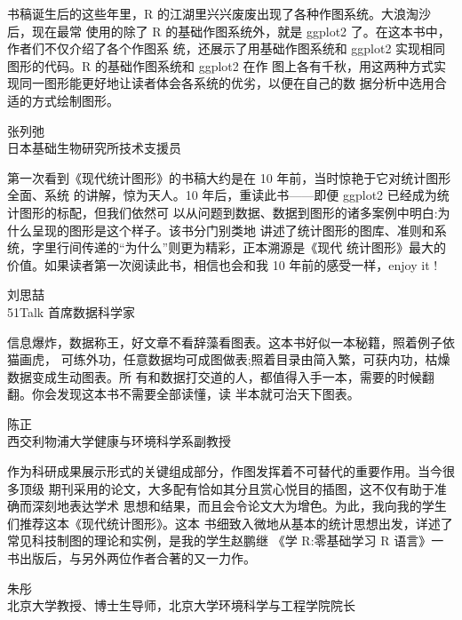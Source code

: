 \documentclass[
  b5paper,
  UTF8,twoside]{book}
\begin{document}
书稿诞生后的这些年里，R 的江湖里兴兴废废出现了各种作图系统。大浪淘沙后，现在最常 使用的除了 R 的基础作图系统外，就是 ggplot2 了。在这本书中，作者们不仅介绍了各个作图系 统，还展示了用基础作图系统和 ggplot2 实现相同图形的代码。R 的基础作图系统和 ggplot2 在作 图上各有千秋，用这两种方式实现同一图形能更好地让读者体会各系统的优劣，以便在自己的数 据分析中选用合适的方式绘制图形。

\begin{flushright}
张列弛\\
日本基础生物研究所技术支援员
\end{flushright}

第一次看到《现代统计图形》的书稿大约是在 10 年前，当时惊艳于它对统计图形全面、系统 的讲解，惊为天人。10 年后，重读此书------即便 ggplot2 已经成为统计图形的标配，但我们依然可 以从问题到数据、数据到图形的诸多案例中明白:为什么呈现的图形是这个样子。该书分门别类地 讲述了统计图形的图库、准则和系统，字里行间传递的``为什么''则更为精彩，正本溯源是《现代 统计图形》最大的价值。如果读者第一次阅读此书，相信也会和我 10 年前的感受一样，enjoy it !

\begin{flushright}
刘思喆\\
51Talk 首席数据科学家
\end{flushright}

信息爆炸，数据称王，好文章不看辞藻看图表。这本书好似一本秘籍，照着例子依猫画虎， 可练外功，任意数据均可成图做表;照着目录由简入繁，可获内功，枯燥数据变成生动图表。所 有和数据打交道的人，都值得入手一本，需要的时候翻翻。你会发现这本书不需要全部读懂，读 半本就可治天下图表。

\begin{flushright}
陈正\\
西交利物浦大学健康与环境科学系副教授
\end{flushright}

作为科研成果展示形式的关键组成部分，作图发挥着不可替代的重要作用。当今很多顶级 期刊采用的论文，大多配有恰如其分且赏心悦目的插图，这不仅有助于准确而深刻地表达学术 思想和结果，而且会令论文大为增色。为此，我向我的学生们推荐这本《现代统计图形》。这本 书细致入微地从基本的统计思想出发，详述了常见科技制图的理论和实例，是我的学生赵鹏继
《学 R:零基础学习 R 语言》一书出版后，与另外两位作者合著的又一力作。

\begin{flushright}
朱彤\\
北京大学教授、博士生导师，北京大学环境科学与工程学院院长
\end{flushright}
\end{document}
